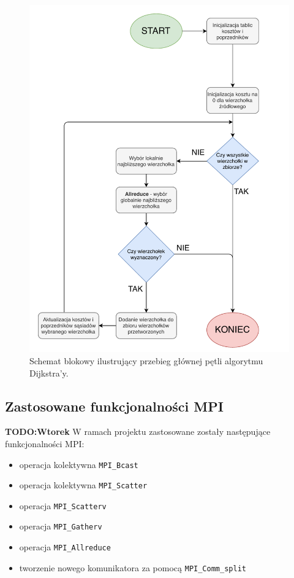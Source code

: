 \documentclass[12pt]{article}
\begin{document}
\begin{figure}[H]
\centering
\includegraphics[width=\textwidth]{static/Diagram3.pdf}
\caption{Schemat blokowy ilustrujący przebieg głównej pętli algorytmu Dijkstra'y.}
\label{fig:diagram3}
\end{figure}


\subsection{Zastosowane funkcjonalności MPI}
\textbf{TODO:Wtorek}
W ramach projektu zastosowane zostały następujące funkcjonalności MPI:
\begin{itemize}
\item operacja kolektywna \lstinline{MPI_Bcast}
\item operacja kolektywna \lstinline{MPI_Scatter}
\item operacja \lstinline{MPI_Scatterv}
\item operacja \lstinline{MPI_Gatherv}
\item operacja \lstinline{MPI_Allreduce}
\item tworzenie nowego komunikatora za pomocą \lstinline{MPI_Comm_split}
\end{itemize}
\end{document}

